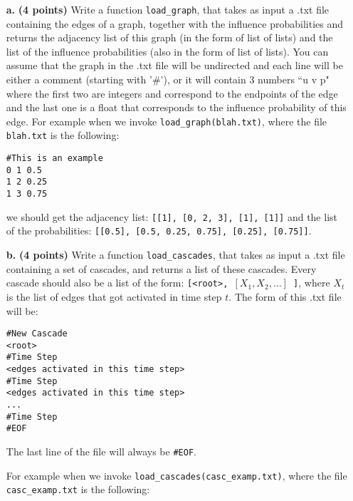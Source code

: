 \documentclass[11pt]{article}
\theoremstyle{definition} \newtheorem{Theorem}{theorem}
\begin{document}
\begin{itemize}
\item[\textbf{a. }] \textbf{(4 points)} Write a function \texttt{load\_graph}, that takes as input a .txt file containing the edges of a graph, together with the influence probabilities and returns the adjacency list of this graph (in the form of list of lists) and the list of the influence probabilities (also in the form of list of lists). You can assume that the graph in the .txt file will be undirected and each line will be either a comment (starting with '\#'), or it will contain 3 numbers ``u v p" where the first two are integers and correspond to the endpoints of the edge and the last one is a float that corresponds to the influence probability of this edge. For example when we invoke \texttt{load\_graph(blah.txt)}, where the file \texttt{blah.txt} is the following:

\noindent \texttt{\#This is an example\\
0 1 0.5\\
1 2 0.25\\
1 3 0.75
}

\noindent we should get the adjacency list: \texttt{[[1], [0, 2, 3], [1], [1]]} and the list of the probabilities: \texttt{[[0.5], [0.5, 0.25, 0.75], [0.25], [0.75]]}.

\item[\textbf{b. }] \textbf{(4 points)} Write a function \texttt{load\_cascades}, that takes as input a .txt file containing a set of cascades, and returns a list of these cascades. Every cascade should also be a list of the form: \texttt{[<root>, $[X_1, X_2, \ldots]$ ]}, where $X_t$ is the list of edges that got activated in time step $t$. The form of this .txt file will be:

\noindent \texttt{\#New Cascade\\
<root>\\
\#Time Step\\
<edges activated in this time step>\\
\#Time Step\\
<edges activated in this time step>\\
...\\
\#Time Step\\
\#EOF
}

The last line of the file will always be \texttt{\#EOF}.

For example when we invoke \texttt{load\_cascades(casc\_examp.txt)}, where the file \texttt{casc\_examp.txt} is the following:


\end{itemize}
\end{document}
